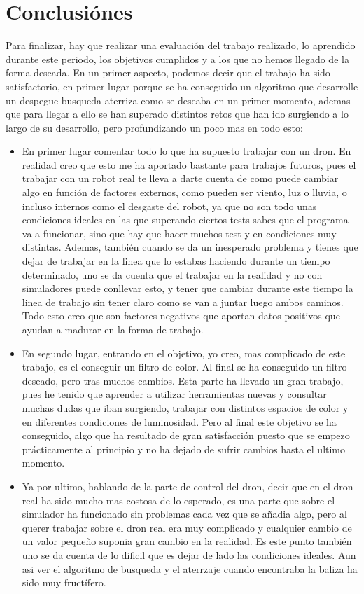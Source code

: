 
\chapter{Conclusi\'ones}\label{cap.conclusiones}
\hspace{1cm} Para finalizar, hay que realizar una evaluaci\'on del trabajo realizado, lo aprendido durante este periodo, los objetivos cumplidos y a los que no hemos llegado de la forma deseada. En un primer aspecto, podemos decir que el trabajo ha sido satisfactorio, en primer lugar porque se ha conseguido un algoritmo que desarrolle un despegue-busqueda-aterriza como se deseaba en un primer momento, ademas que para llegar a ello se han superado distintos retos que han ido surgiendo a lo largo de su desarrollo, pero profundizando un poco mas en todo esto:
\begin{itemize}
	\item En primer lugar comentar todo lo que ha supuesto trabajar con un dron. En realidad creo que esto me ha aportado bastante para trabajos futuros, pues el trabajar con un robot real te lleva a darte cuenta de como puede cambiar algo en funci\'on de factores externos, como pueden ser viento, luz o lluvia, o incluso internos como el desgaste del robot, ya que no son todo unas condiciones ideales en las que superando ciertos tests sabes que el programa va a funcionar, sino que hay que hacer muchos test y en condiciones muy distintas. Ademas, tambi\'en cuando se da un inesperado problema y tienes que dejar de trabajar en la linea que lo estabas haciendo durante un tiempo determinado, uno se da cuenta que el trabajar en la realidad y no con simuladores puede conllevar esto, y tener que cambiar durante este tiempo la linea de trabajo sin tener claro como se van a juntar luego ambos caminos. Todo esto creo que son factores negativos que aportan datos positivos que ayudan a madurar en la forma de trabajo.
	
	\item En segundo lugar, entrando en el objetivo, yo creo, mas complicado de este trabajo, es el conseguir un filtro de color. Al final se ha conseguido un filtro deseado, pero tras muchos cambios. Esta parte ha llevado un gran trabajo, pues he tenido que aprender a utilizar herramientas nuevas y consultar muchas dudas que iban surgiendo, trabajar con distintos espacios de color y en diferentes condiciones de luminosidad. Pero al final este objetivo se ha conseguido, algo que ha resultado de gran satisfacci\'on puesto que se empezo pr\'acticamente al principio y no ha dejado de sufrir cambios hasta el ultimo momento.
	
	\item Ya por ultimo, hablando de la parte de control del dron, decir que en el dron real ha sido mucho mas costosa de lo esperado, es una parte que sobre el simulador ha funcionado sin problemas cada vez que se añadia algo, pero al querer trabajar sobre el dron real era muy complicado y cualquier cambio de un valor pequeño suponia gran cambio en la realidad. Es este punto tambi\'en uno se da cuenta de lo dificil que es dejar de lado las condiciones ideales. Aun asi ver el algoritmo de busqueda y el aterrzaje cuando encontraba la baliza ha sido muy fruct\'ifero.
\end{itemize}

